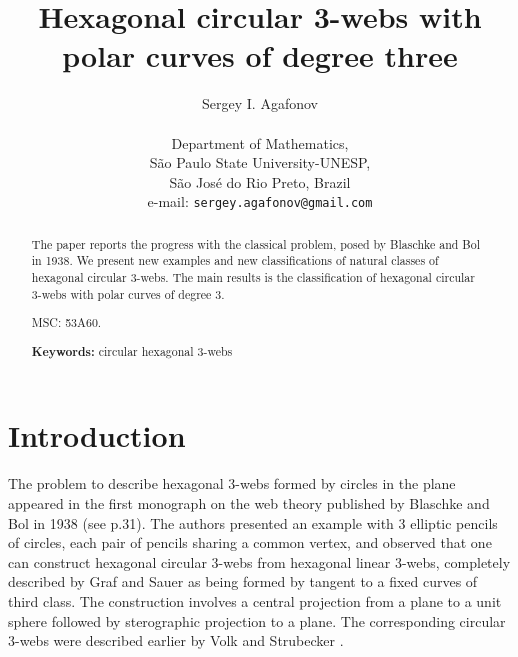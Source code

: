 \documentclass[11pt,a4paper]{article}
\begin{document}
\title{Hexagonal circular 3-webs with polar curves of degree three}


\author{{\Large Sergey I. Agafonov}\\
\\
Department of Mathematics,\\
S\~ao Paulo State University-UNESP,\\ S\~ao Jos\'e do Rio Preto, Brazil\\
e-mail: {\tt sergey.agafonov@gmail.com} }
\date{}
\maketitle
\unitlength=1mm

\vspace{1cm}





\begin{abstract}   
The paper reports the progress with the classical problem, posed by Blaschke and Bol in 1938. We present new examples and new classifications of natural classes of hexagonal circular 3-webs. The main results is the classification of hexagonal circular 3-webs with polar curves of degree 3. 


\bigskip

\medskip

\noindent MSC: 53A60.

\medskip

\noindent
{\bf Keywords:} circular hexagonal 3-webs
\end{abstract}





\section{Introduction} 

The problem to describe hexagonal 3-webs formed by circles in the plane appeared in the first monograph on the web theory published by Blaschke and Bol in 1938 (see \cite{BB-38} p.31). The authors presented an example with 3 elliptic pencils of circles, each pair of pencils sharing  a common vertex, and observed that one can construct hexagonal circular 3-webs from  hexagonal linear 3-webs, completely described by Graf and Sauer \cite{GS-24} as being formed by tangent to a fixed curves of third class. The construction involves a central projection from a plane to a unit sphere followed by sterographic projection to a plane. The corresponding circular 3-webs were described earlier by Volk  \cite{V-29} and  Strubecker \cite{S-32}. 
\end{document}
